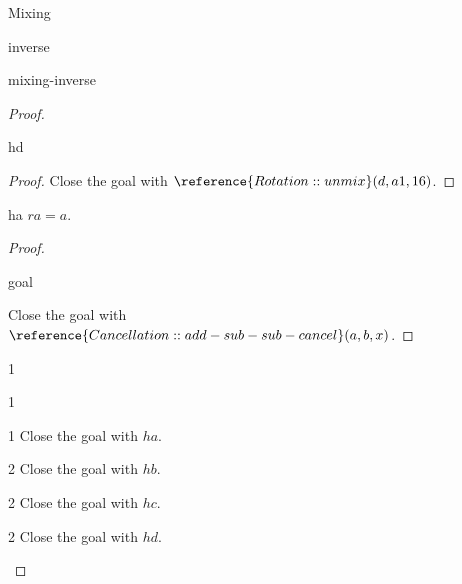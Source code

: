 \begin{lexlean}{Mixing}
\begin{section}{inverse}
\begin{theorem}{mixing-inverse}
\begin{proof}
\begin{have}{hd}
\begin{proof}
  Close the goal with \(\reference{Rotation::unmix}(d, a1, 16)\).
  \end{proof}
  \end{have}
  \begin{have}{ha}
  \(ra = a\).
  \begin{proof}
  \begin{rewrite}{goal}
  \end{rewrite}
  Close the goal with \(\reference{Cancellation::add-sub-sub-cancel}(a, b, x)\).
  \end{proof}
  \end{have}
  \begin{constructor}
  \begin{branch}{1}
  \begin{constructor}
  \begin{branch}{1}
  \begin{constructor}
  \begin{branch}{1}
  Close the goal with \(ha\).
  \end{branch}
  \begin{branch}{2}
  Close the goal with \(hb\).
  \end{branch}
  \end{constructor}
  \end{branch}
  \begin{branch}{2}
  Close the goal with \(hc\).
  \end{branch}
  \end{constructor}
  \end{branch}
  \begin{branch}{2}
  Close the goal with \(hd\).
  \end{branch}
  \end{constructor}
  \end{proof}
  \end{theorem}
\end{section}
\end{lexlean}
